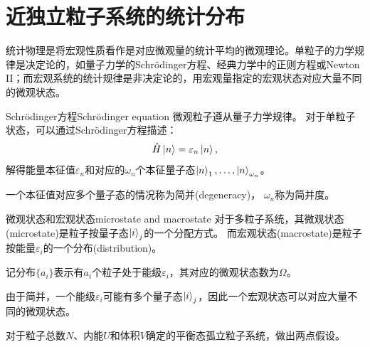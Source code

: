 \newcommand{\Om}[1][]{\Omega_{\mathrm{#1}}}

\chapter{近独立粒子系统的统计分布}

统计物理是将宏观性质看作是对应微观量的统计平均的微观理论。单粒子的力学规律是决定论的，如量子力学的Schrödinger方程、经典力学中的正则方程或Newton II；而宏观系统的统计规律是非决定论的，用宏观量指定的宏观状态对应大量不同的微观状态。


\begin{theorem}
	{Schrödinger方程}{Schrödinger equation}
	微观粒子遵从量子力学规律。
	对于单粒子状态，可以通过Schrödinger方程描述：
	\begin{equation}
		\hat H\left\vert n\right\rangle=\varepsilon_n\left\vert n\right\rangle,
	\end{equation}
	解得能量本征值$\varepsilon_n$和对应的$\omega_n$个本征量子态$\left\vert n\right\rangle_1,\ldots,\left\vert n\right\rangle_{\omega_n}$。

	一个本征值对应多个量子态的情况称为简并(degeneracy)，
	$\omega_n$称为简并度。
\end{theorem}


\begin{definition}
	{微观状态和宏观状态}{microstate and macrostate}
	对于多粒子系统，其微观状态(microstate)是粒子按量子态$\left\vert i\right\rangle_j$的一个分配方式。
	而宏观状态(macrostate)是粒子按能量$\varepsilon_i$的一个分布(distribution)。

	记分布$\{a_i\}$表示有$a_i$个粒子处于能级$\varepsilon_i$，其对应的微观状态数为$\Omega$。
\end{definition}

\begin{corollary}
	由于简并，一个能级$\varepsilon_i$可能有多个量子态$\left\vert i\right\rangle_j$，因此一个宏观状态可以对应大量不同的微观状态。
\end{corollary}

对于粒子总数$N$、内能$U$和体积$V$确定的平衡态孤立粒子系统，做出两点假设。

